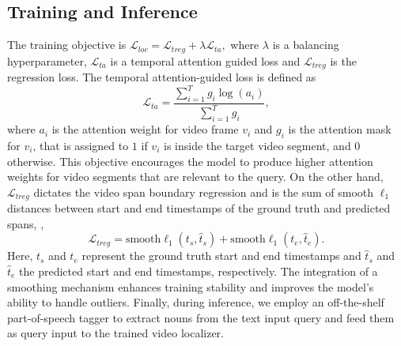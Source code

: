 
\subsection{Training and Inference}
The training objective is 
$\mathcal{L}_{loc} = \mathcal{L}_{treg}+\lambda \mathcal{L}_{ta},$ where \(\lambda\) is a balancing hyperparameter, \(\mathcal{L}_{ta}\) is a temporal attention guided loss and \(\mathcal{L}_{treg}\) is the regression loss.  The temporal attention-guided loss is defined as
\begin{equation}
\label{tatt}
\mathcal{L}_{ta} = \frac{\sum^{T}_{i=1}g_{i}\log \left( a_{i}\right)}{\sum^{T}_{i=1}g_{i}},
\end{equation}
where \(a_{i}\) is the attention weight for video frame \(v_{i}\) and \(g_{i}\) is the attention mask for \(v_{i}\), that is assigned to \(1\) if \(v_{i}\) is inside the target video segment, and \(0\) otherwise. 
This objective encourages the model to produce higher attention weights for video segments that are relevant to the query. 
On the other hand, \(\mathcal{L}_{treg}\) dictates the video span boundary regression and is the sum of smooth $\ell_1$ distances between start and end timestamps of the ground truth and predicted spans, \ie,
\begin{equation}
\label{treg}
\mathcal{L}_{treg} = \text{smooth}{\ell_1}(t_{s}, \hat{t}_{s}) + \text{smooth}{\ell_1}(t_{e}, \hat{t}_{e}).
\end{equation}
Here, $t_{s}$ and ${t}_{e}$ represent the ground truth start and end timestamps and $\hat{t}_{s}$ and $\hat{t}_{e}$ the predicted start and end timestamps, respectively.
The integration of a smoothing mechanism enhances training stability and improves the model's ability to handle outliers. Finally, during inference, we employ an off-the-shelf part-of-speech tagger to extract nouns from the text input query and feed them as query input to the trained \modelname video localizer.